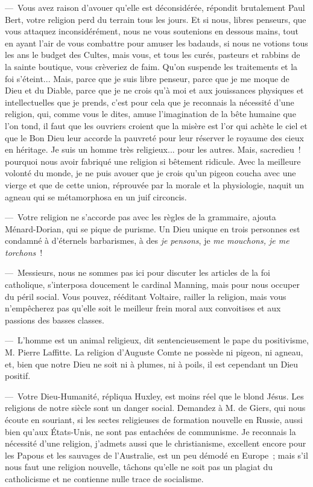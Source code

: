 \documentclass[french,twoside]{book} %
\begin{document}
— Vous avez raison d’avouer qu’elle est déconsidérée, répondit brutalement Paul Bert, votre religion perd du terrain tous les jours. Et si nous, libres penseurs, que vous attaquez inconsidérément, nous ne vous soutenions en dessous mains, tout en ayant l’air de vous combattre pour amuser les badauds, si nous ne votions tous les ans le budget des Cultes, mais vous, et tous les curés, pasteurs et rabbins de la sainte boutique, vous crèveriez de faim. Qu'on suspende les traitements et la foi s’éteint... Mais, parce que je suis libre penseur, parce que je me moque de Dieu et du Diable, parce que je ne crois qu’à moi et aux jouissances physiques et intellectuelles que je prends, c’est pour cela que je reconnais la nécessité d’une religion, qui, comme vous le dites, amuse l’imagination de la bête humaine que l’on tond, il faut que les ouvriers croient que la misère est l’or qui achète le ciel et que le Bon Dieu leur accorde la pauvreté pour leur réserver le royaume des cieux en héritage. Je suis un homme très religieux... pour les autres. Mais, sacredieu ! pourquoi nous avoir fabriqué une religion si bêtement ridicule. Avec la meilleure volonté du monde, je ne puis avouer que je crois qu’un pigeon coucha avec une vierge et que de cette union, réprouvée par la morale et la physiologie, naquit un agneau qui se métamorphosa en un juif circoncis.\par
— Votre religion ne s’accorde pas avec les règles de la grammaire, ajouta Ménard-Dorian, qui se pique de purisme. Un Dieu unique en trois personnes est condamné à d’éternels barbarismes, à des \emph{je pensons}, je \emph{me mouchons, je me torchons} !\par
— Messieurs, nous ne sommes pas ici pour discuter les articles de la foi catholique, s’interposa doucement le cardinal Manning, mais pour nous occuper du péril social. Vous pouvez, rééditant Voltaire, railler la religion, mais vous n’empêcherez pas qu’elle soit le meilleur frein moral aux convoitises et aux passions des basses classes.\par
— L'homme est un animal religieux, dit sentencieusement le pape du positivisme, M. Pierre Laffitte. La religion d’Auguste Comte ne possède ni pigeon, ni agneau, et, bien que notre Dieu ne soit ni à plumes, ni à poils, il est cependant un Dieu positif.\par
— Votre Dieu-Humanité, répliqua Huxley, est moins réel que le blond Jésus. Les religions de notre siècle sont un danger social. Demandez à M. de Giers, qui nous écoute en souriant, si les sectes religieuses de formation nouvelle en Russie, aussi bien qu’aux États-Unis, ne sont pas entachées de communisme. Je reconnais la nécessité d’une religion, j’admets aussi que le christianisme, excellent encore pour les Papous et les sauvages de l’Australie, est un peu démodé en Europe ; mais s’il nous faut une religion nouvelle, tâchons qu’elle ne soit pas un plagiat du catholicisme et ne contienne nulle trace de socialisme.\par
\end{document}
